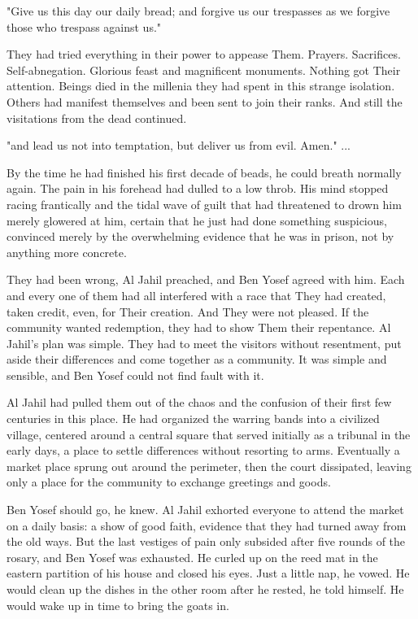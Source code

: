 \documentclass{amsart}
\begin{document}
"Give us this day our daily bread; and forgive us our trespasses as we forgive those who trespass against us."

They had tried everything in their power to appease Them. Prayers. Sacrifices. Self-abnegation. Glorious feast and magnificent monuments. Nothing got Their attention. Beings died in the millenia they had spent in this strange isolation. Others had manifest themselves and been sent to join their ranks. And still the visitations from the dead continued. 

"and lead us not into temptation, but deliver us from evil. Amen." ...

By the time he had finished his first decade of beads, he could breath normally again. The pain in his forehead had dulled to a low throb. His mind stopped racing frantically and the tidal wave of guilt that had threatened to drown him merely glowered at him, certain that he just had done something suspicious, convinced merely by the overwhelming evidence that he was in prison, not by anything more concrete.

They had been wrong, Al Jahil preached, and Ben Yosef agreed with him. Each and every one of them had all interfered with a race that They had created, taken credit, even, for Their creation. And They were not pleased. If the community wanted redemption, they had to show Them their repentance. Al Jahil's plan was simple. They had to meet the visitors without resentment, put aside their differences and come together as a community. It was simple and sensible, and Ben Yosef could not find fault with it. 

Al Jahil had pulled them out of the chaos and the confusion of their first few centuries in this place. He had organized the warring bands into a civilized village, centered around a central square that served initially as a tribunal in the early days, a place to settle differences without resorting to arms. Eventually a market place sprung out around the perimeter, then the court dissipated, leaving only a place for the community to exchange greetings and goods. 

Ben Yosef should go, he knew. Al Jahil exhorted everyone to attend the market on a daily basis: a show of good faith, evidence that they had turned away from the old ways. But the last vestiges of pain only subsided after five rounds of the rosary, and Ben Yosef was exhausted. He curled up on the reed mat in the eastern partition of his house and closed his eyes. Just a little nap, he vowed. He would clean up the dishes in the other room after he rested, he told himself. He would wake up in time to bring the goats in.
\end{document}
